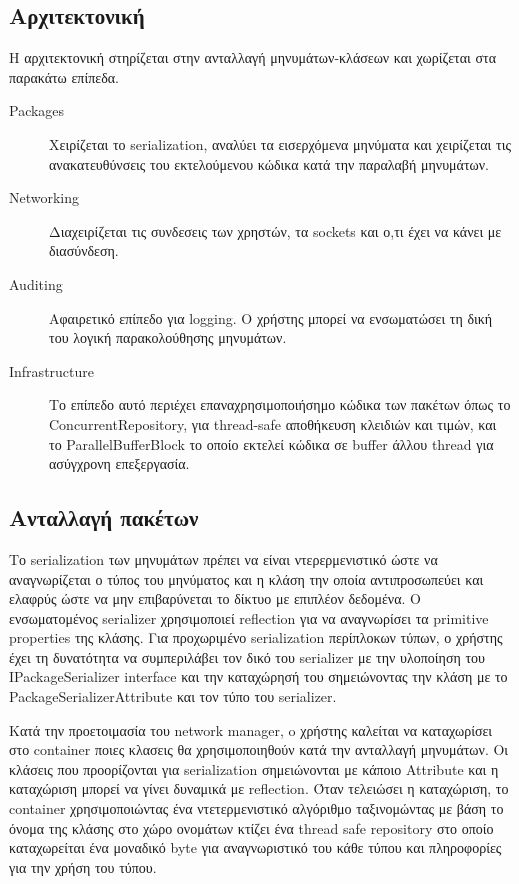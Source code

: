 		\subsection{Αρχιτεκτονική}	
		Η αρχιτεκτονική στηρίζεται στην ανταλλαγή μηνυμάτων-κλάσεων και χωρίζεται στα παρακάτω επίπεδα.
			\begin{description}
				\item [Packages] Χειρίζεται το serialization, αναλύει τα εισερχόμενα μηνύματα και χειρίζεται τις ανακατευθύνσεις του εκτελούμενου κώδικα κατά την παραλαβή μηνυμάτων. 
				\item [Networking] Διαχειρίζεται τις συνδεσεις των χρηστών, τα sockets και ο,τι έχει να κάνει με διασύνδεση.
				\item [Auditing] Αφαιρετικό επίπεδο για logging. Ο χρήστης μπορεί να ενσωματώσει τη δική του λογική παρακολούθησης μηνυμάτων.
				\item [Infrastructure] Το επίπεδο αυτό περιέχει επαναχρησιμοποιήσημο κώδικα των πακέτων όπως το ConcurrentRepository, για thread-safe αποθήκευση κλειδιών και τιμών, και το ParallelBufferBlock το οποίο εκτελεί κώδικα σε buffer άλλου thread για ασύγχρονη επεξεργασία.
			\end{description}
			
			\subsection{Ανταλλαγή πακέτων}	 
			Το serialization των μηνυμάτων πρέπει να είναι ντερερμενιστικό ώστε να αναγνωρίζεται ο τύπος του μηνύματος και η κλάση την οποία αντιπροσωπεύει και ελαφρύς ώστε να μην επιβαρύνεται το δίκτυο με επιπλέον δεδομένα. Ο ενσωματομένος serializer χρησιμοποιεί reflection για να αναγνωρίσει τα primitive properties της κλάσης. Για προχωριμένο serialization περίπλοκων τύπων, ο χρήστης έχει τη δυνατότητα να συμπεριλάβει τον δικό του serializer με την υλοποίηση του IPackageSerializer interface και την καταχώρησή του σημειώνοντας την κλάση με το PackageSerializerAttribute και τον τύπο του serializer.
						
			Κατά την προετοιμασία του network manager, o χρήστης καλείται να καταχωρίσει στο container ποιες κλασεις θα χρησιμοποιηθούν κατά την ανταλλαγή μηνυμάτων. Οι κλάσεις που προορίζονται για serialization σημειώνονται με κάποιο Attribute και η καταχώριση μπορεί να γίνει δυναμικά με reflection.
			Όταν τελειώσει η καταχώριση, το container χρησιμοποιώντας ένα ντετερμενιστικό αλγόριθμο ταξινομώντας με βάση το όνομα της κλάσης στο χώρο ονομάτων κτίζει ένα thread safe repository στο οποίο καταχωρείται ένα μοναδικό byte για αναγνωριστικό του κάθε τύπου και πληροφορίες για την χρήση του τύπου.
			
